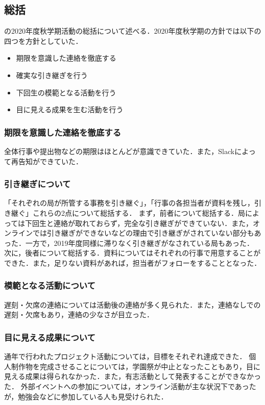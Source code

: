 \subsection*{\secondGrade{}総括}


\secondGrade{}の2020年度秋学期活動の総括について述べる．2020年度秋学期の方針では以下の四つを方針としていた．
\begin{itemize}
    \item 期限を意識した連絡を徹底する
    \item 確実な引き継ぎを行う
    \item 下回生の模範となる活動を行う
    \item 目に見える成果を生む活動を行う
\end{itemize}

\subsubsection*{期限を意識した連絡を徹底する}
全体行事や提出物などの期限はほとんどが意識できていた．また，Slackによって再告知ができていた．

\subsubsection*{引き継ぎについて}
「それぞれの局が所管する事務を引き継ぐ」，「行事の各担当者が資料を残し，引き継ぐ」これらの2点について総括する．
まず，前者について総括する．局によっては下回生と連絡が取れておらず，完全な引き継ぎができていない．また，オンラインでは引き継ぎができないなどの理由で引き継ぎがされていない部分もあった．一方で，2019年度同様に滞りなく引き継ぎがなされている局もあった．
次に，後者について総括する．資料についてはそれぞれの行事で用意することができた．また，足りない資料があれば，担当者がフォローをすることとなった．

\subsubsection*{模範となる活動について}
遅刻・欠席の連絡については活動後の連絡が多く見られた．また，連絡なしでの遅刻・欠席もあり，連絡の少なさが目立った．

\subsubsection*{目に見える成果について}
通年で行われたプロジェクト活動については，目標をそれぞれ達成できた．
個人制作物を完成させることについては，学園祭が中止となったこともあり，目に見える成果は得られなかった．また，有志活動として発表することができなかった．
外部イベントへの参加については，オンライン活動が主な状況下であったが，勉強会などに参加している人も見受けられた．
